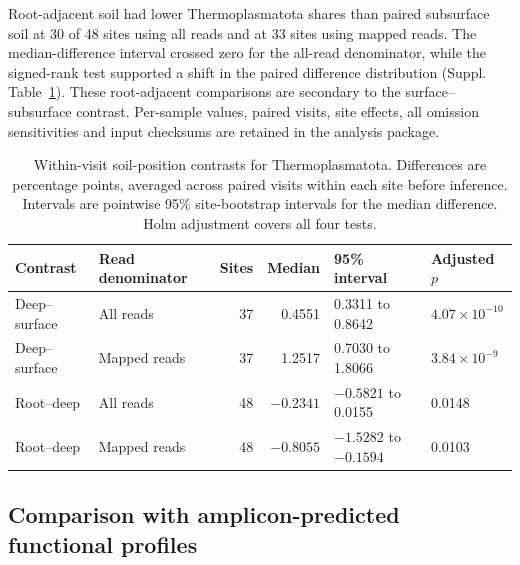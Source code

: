 Root-adjacent soil had lower Thermoplasmatota shares than paired subsurface soil at 30 of 48 sites using all reads and at 33 sites using mapped reads. The median-difference interval crossed zero for the all-read denominator, while the signed-rank test supported a shift in the paired difference distribution (Suppl. Table~\ref{tab:depth}). These root-adjacent comparisons are secondary to the surface--subsurface contrast. Per-sample values, paired visits, site effects, all omission sensitivities and input checksums are retained in the analysis package.

\begin{table}[ht]\centering\small
\caption{Within-visit soil-position contrasts for Thermoplasmatota. Differences are percentage points, averaged across paired visits within each site before inference. Intervals are pointwise 95\% site-bootstrap intervals for the median difference. Holm adjustment covers all four tests.}\label{tab:depth}
\begin{tabular}{@{}llrrll@{}}\toprule
Contrast & Read denominator & Sites & Median & 95\% interval & Adjusted $p$\\\midrule
Deep--surface & All reads & 37 & 0.4551 & 0.3311 to 0.8642 & $4.07\times10^{-10}$\\
Deep--surface & Mapped reads & 37 & 1.2517 & 0.7030 to 1.8066 & $3.84\times10^{-9}$\\
Root--deep & All reads & 48 & $-0.2341$ & $-0.5821$ to 0.0155 & 0.0148\\
Root--deep & Mapped reads & 48 & $-0.8055$ & $-1.5282$ to $-0.1594$ & 0.0103\\\bottomrule
\end{tabular}
\end{table}

\subsection*{Comparison with amplicon-predicted functional profiles}



